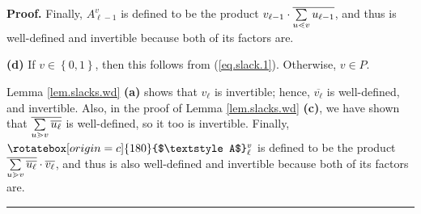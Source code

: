 \documentclass[numbers=enddot,12pt,final,onecolumn,notitlepage]{scrartcl}%
\theoremstyle{definition}
\newenvironment{vershort}{}{}
\newcommand{\upslack}{\mathchoice{\rotatebox[origin=c]{180}{$\displaystyle A$}}{\rotatebox[origin=c]{180}{$\textstyle A$}}{\rotatebox[origin=c]{180}{$\scriptstyle A$}}{\rotatebox[origin=c]{180}{$\scriptscriptstyle A$}}}
\newcommand{\downslack}{A}
\newenvironment{proof}[1][Proof]{\noindent\textbf{#1.} }{\ \rule{0.5em}{0.5em}}
\let\sumnonlimits\sum
\renewcommand{\sum}{\sumnonlimits\limits}
\begin{document}
\begin{vershort}
\begin{proof}
Finally, $\downslack_{\ell-1}^{v}$ is defined to be the product $v_{\ell
-1}\cdot\overline{\sum\limits_{u\lessdot v}u_{\ell-1}}$, and thus is
well-defined and invertible because both of its factors are. \medskip

\textbf{(d)} If $v\in\left\{  0,1\right\}  $, then this follows from
(\ref{eq.slack.1}). Otherwise, $v\in P$.

Lemma \ref{lem.slacks.wd} \textbf{(a)} shows that $v_{\ell}$ is invertible;
hence, $\overline{v_{\ell}}$ is well-defined, and invertible. Also, in the
proof of Lemma \ref{lem.slacks.wd} \textbf{(c)}, we have shown that
$\overline{\sum\limits_{u\gtrdot v}\overline{u_{\ell}}}$ is well-defined, so
it too is invertible. Finally, $\upslack_{\ell}^{v}$ is defined to be the
product $\overline{\sum\limits_{u\gtrdot v}\overline{u_{\ell}}}\cdot
\overline{v_{\ell}}$, and thus is also well-defined and invertible because
both of its factors are.
\end{proof}
\end{vershort}
\end{document}
